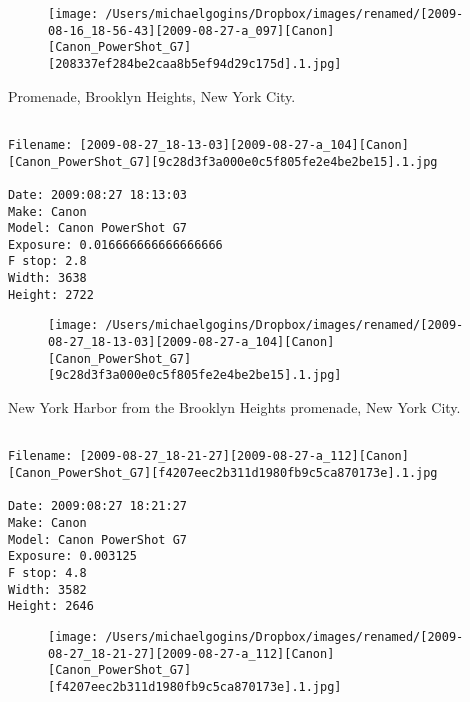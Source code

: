 \begin{figure}
\texttt{[image: /Users/michaelgogins/Dropbox/images/renamed/[2009-08-16\_18-56-43][2009-08-27-a\_097][Canon][Canon\_PowerShot\_G7][208337ef284be2caa8b5ef94d29c175d].1.jpg]}
\end{figure}
    
\clearpage
\onecolumn
\noindent Promenade, Brooklyn Heights, New York City.
\noindent
\begin{lstlisting}

Filename: [2009-08-27_18-13-03][2009-08-27-a_104][Canon][Canon_PowerShot_G7][9c28d3f3a000e0c5f805fe2e4be2be15].1.jpg

Date: 2009:08:27 18:13:03
Make: Canon
Model: Canon PowerShot G7
Exposure: 0.016666666666666666
F stop: 2.8
Width: 3638
Height: 2722
\end{lstlisting}
\clearpage

\begin{figure}
\texttt{[image: /Users/michaelgogins/Dropbox/images/renamed/[2009-08-27\_18-13-03][2009-08-27-a\_104][Canon][Canon\_PowerShot\_G7][9c28d3f3a000e0c5f805fe2e4be2be15].1.jpg]}
\end{figure}
    
\clearpage
\onecolumn
\noindent New York Harbor from the Brooklyn Heights promenade, New York City.
\noindent
\begin{lstlisting}

Filename: [2009-08-27_18-21-27][2009-08-27-a_112][Canon][Canon_PowerShot_G7][f4207eec2b311d1980fb9c5ca870173e].1.jpg

Date: 2009:08:27 18:21:27
Make: Canon
Model: Canon PowerShot G7
Exposure: 0.003125
F stop: 4.8
Width: 3582
Height: 2646
\end{lstlisting}
\clearpage

\begin{figure}
\texttt{[image: /Users/michaelgogins/Dropbox/images/renamed/[2009-08-27\_18-21-27][2009-08-27-a\_112][Canon][Canon\_PowerShot\_G7][f4207eec2b311d1980fb9c5ca870173e].1.jpg]}
\end{figure}
    
